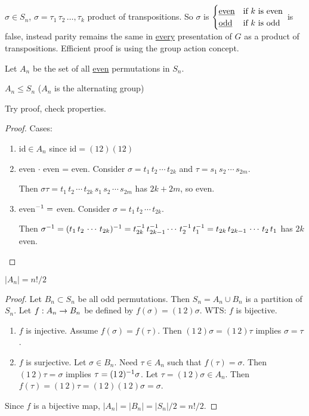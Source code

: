 \documentclass[]{article}
\begin{document}
$\sigma\in S_n$, $\sigma = \tau_1\,\tau_2\,\dots,\tau_k$ product of transpositions.
So $\sigma$ is $\begin{cases} \text{\underline{even}} & \text{if $k$ is even} \\ \text{\underline{odd}} & \text{if $k$ is odd} \end{cases}$ is false, instead parity remains the same in \ul{every} presentation of $G$ as a product of transpositions. Efficient proof is using the group action concept.

Let $A_n$ be the set of all \ul{even} permutations in $S_n$.
\begin{proposition}
	$A_n\leq S_n$ ($A_n$ is the alternating group)
\end{proposition}
Try proof, check properties.

\begin{proof}
	Cases:
	\begin{enumerate}
		\item $\text{id}\in A_n$ since $\text{id} = (12)(12)$
		\item even $\cdot$ even = even. Consider $\sigma = t_1\,t_2\,\cdots\,t_{2k}$ and $\tau = s_1\,s_2\,\cdots\,s_{2m}$.
			
			Then $\sigma\tau = t_1\,t_2\,\cdots\,t_{2k}\,s_1\,s_2\,\cdots\,s_{2m}$ has $2k+2m$, so even.
		\item even$^{-1} =$ even. Consider $\sigma = t_1\,t_2\,\cdots\,t_{2k}$.
			
			Then $\sigma^{-1} = (t_1\,t_2\,\cdots\,t_{2k})^{-1} = t_{2k}^{-1}\,t_{2k-1}^{-1}\cdots\, t_2^{-1}\,t_1^{-1} = t_{2k}\,t_{2k-1}\,\cdots\,t_2\,t_1$ has $2k$ even.
	\end{enumerate}
\end{proof}

\begin{proposition}
	$|A_n| = n!/2$
\end{proposition}
\begin{proof}
	Let $B_n\subset S_n$ be all odd permutations. Then $S_n = A_n\cup B_n$ is a partition of $S_n$. Let $f: A_n\rightarrow B_n$ be defined by $f(\sigma) = (1\,2)\sigma$.
	WTS: $f$ is bijective.
	\begin{enumerate}
		\item $f$ is injective. Assume $f(\sigma) = f(\tau)$. Then $(1\,2)\sigma = (1\,2)\tau$ implies $\sigma = \tau$.
		\item $f$ is surjective. Let $\sigma\in B_n$. Need $\tau\in A_n$ such that $f(\tau) = \sigma$. Then $(1\,2)\tau = \sigma$ implies $\tau = (1\,2)^{-1}\sigma$. Let $\tau = (1\,2)\sigma\in A_n$. Then $f(\tau) = (1\,2)\tau = (1\,2)(1\,2)\sigma = \sigma$.
	\end{enumerate}
	Since $f$ is a bijective map, $|A_n| = |B_n| = |S_n|/2 = n!/2$.
\end{proof}
\end{document}

